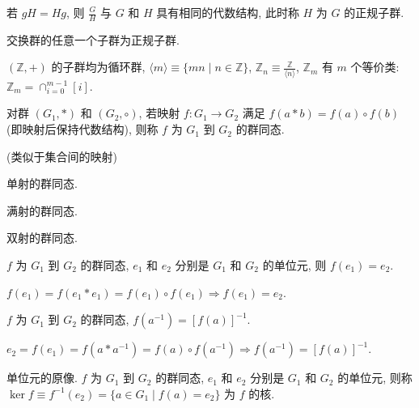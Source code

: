 \documentclass{note}
\begin{document}
\begin{thm}[正规子群]
    若 $gH=Hg$, 则 $\frac{G}{H}$ 与 $G$ 和 $H$ 具有相同的代数结构, 此时称 $H$ 为 $G$ 的正规子群.
\end{thm}

\begin{thm}
    交换群的任意一个子群为正规子群.
\end{thm}

\begin{eg}
    $(\mathbb{Z},+)$ 的子群均为循环群, $\langle m\rangle\equiv\{mn\mid n\in\mathbb{Z}\}$, $\mathbb{Z}_n\equiv\frac{\mathbb{Z}}{\langle n\rangle}$, $\mathbb{Z}_m$ 有 $m$ 个等价类: $\mathbb{Z}_m=\cap_{i=0}^{m-1}[i]$.
\end{eg}

\begin{df}[群同态]
    对群 $(G_1,*)$ 和 $(G_2,\circ)$, 若映射 $f:G_1\rightarrow G_2$ 满足 $f(a*b)=f(a)\circ f(b)$ (即映射后保持代数结构), 则称 $f$ 为 $G_1$ 到 $G_2$ 的群同态.
\end{df}
(类似于集合间的映射)

\begin{df}[单同态]
    单射的群同态.
\end{df}

\begin{df}[满同态]
    满射的群同态.
\end{df}

\begin{df}[同构]
    双射的群同态.
\end{df}

\begin{thm}
    $f$ 为 $G_1$ 到 $G_2$ 的群同态, $e_1$ 和 $e_2$ 分别是 $G_1$ 和 $G_2$ 的单位元, 则 $f(e_1)=e_2$.
\end{thm}
\begin{pf}
    $f(e_1)=f(e_1*e_1)=f(e_1)\circ f(e_1)\Longrightarrow f(e_1)=e_2$.
\end{pf}

\begin{thm}
    $f$ 为 $G_1$ 到 $G_2$ 的群同态, $f(a^{-1})=[f(a)]^{-1}$.
\end{thm}
\begin{pf}
    $e_2=f(e_1)=f(a*a^{-1})=f(a)\circ f(a^{-1})\Longrightarrow f(a^{-1})=[f(a)]^{-1}$.
\end{pf}

\begin{df}
    单位元的原像. $f$ 为 $G_1$ 到 $G_2$ 的群同态, $e_1$ 和 $e_2$ 分别是 $G_1$ 和 $G_2$ 的单位元, 则称 $\ker f\equiv f^{-1}(e_2)=\{a\in G_1\mid f(a)=e_2\}$ 为 $f$ 的核.
\end{df}
\end{document}

